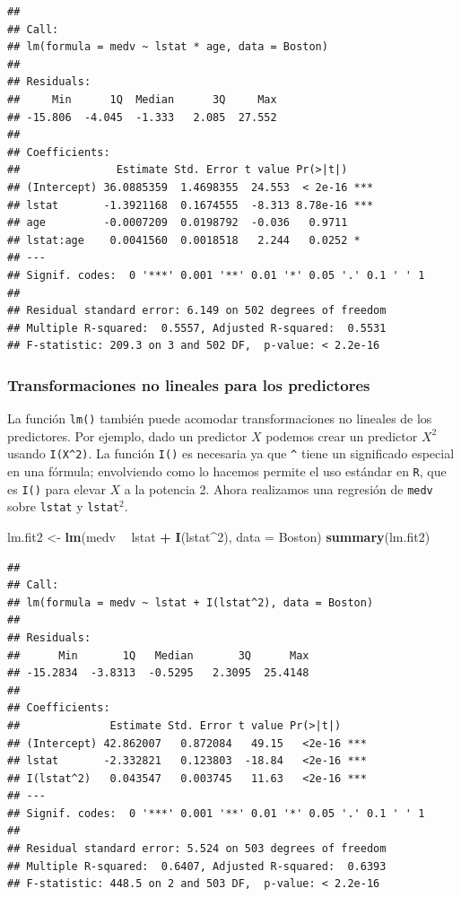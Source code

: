 \documentclass[]{book}
\newenvironment{Shaded}{\begin{snugshade}}{\end{snugshade}}
\newcommand{\KeywordTok}[1]{\textcolor[rgb]{0.13,0.29,0.53}{\textbf{#1}}}
\newcommand{\DataTypeTok}[1]{\textcolor[rgb]{0.13,0.29,0.53}{#1}}
\newcommand{\DecValTok}[1]{\textcolor[rgb]{0.00,0.00,0.81}{#1}}
\newcommand{\StringTok}[1]{\textcolor[rgb]{0.31,0.60,0.02}{#1}}
\newcommand{\OperatorTok}[1]{\textcolor[rgb]{0.81,0.36,0.00}{\textbf{#1}}}
\newcommand{\NormalTok}[1]{#1}
\begin{document}
\begin{verbatim}
## 
## Call:
## lm(formula = medv ~ lstat * age, data = Boston)
## 
## Residuals:
##     Min      1Q  Median      3Q     Max 
## -15.806  -4.045  -1.333   2.085  27.552 
## 
## Coefficients:
##               Estimate Std. Error t value Pr(>|t|)    
## (Intercept) 36.0885359  1.4698355  24.553  < 2e-16 ***
## lstat       -1.3921168  0.1674555  -8.313 8.78e-16 ***
## age         -0.0007209  0.0198792  -0.036   0.9711    
## lstat:age    0.0041560  0.0018518   2.244   0.0252 *  
## ---
## Signif. codes:  0 '***' 0.001 '**' 0.01 '*' 0.05 '.' 0.1 ' ' 1
## 
## Residual standard error: 6.149 on 502 degrees of freedom
## Multiple R-squared:  0.5557, Adjusted R-squared:  0.5531 
## F-statistic: 209.3 on 3 and 502 DF,  p-value: < 2.2e-16
\end{verbatim}

\subsubsection{Transformaciones no lineales para los
predictores}\label{transformaciones-no-lineales-para-los-predictores}

La función \texttt{lm()} también puede acomodar transformaciones no
lineales de los predictores. Por ejemplo, dado un predictor \(X\)
podemos crear un predictor \(X^2\) usando \texttt{I(X\^{}2)}. La función
\texttt{I()} es necesaria ya que \texttt{\^{}} tiene un significado
especial en una fórmula; envolviendo como lo hacemos permite el uso
estándar en \texttt{R}, que es \texttt{I()} para elevar \(X\) a la
potencia 2. Ahora realizamos una regresión de \texttt{medv} sobre
\texttt{lstat} y \texttt{lstat}\(^2\).

\begin{Shaded}
\begin{Highlighting}[]
\NormalTok{lm.fit2 <-}\StringTok{ }\KeywordTok{lm}\NormalTok{(medv }\OperatorTok{~}\StringTok{ }\NormalTok{lstat }\OperatorTok{+}\StringTok{ }\KeywordTok{I}\NormalTok{(lstat}\OperatorTok{^}\DecValTok{2}\NormalTok{), }\DataTypeTok{data =}\NormalTok{ Boston)}
\KeywordTok{summary}\NormalTok{(lm.fit2)}
\end{Highlighting}
\end{Shaded}

\begin{verbatim}
## 
## Call:
## lm(formula = medv ~ lstat + I(lstat^2), data = Boston)
## 
## Residuals:
##      Min       1Q   Median       3Q      Max 
## -15.2834  -3.8313  -0.5295   2.3095  25.4148 
## 
## Coefficients:
##              Estimate Std. Error t value Pr(>|t|)    
## (Intercept) 42.862007   0.872084   49.15   <2e-16 ***
## lstat       -2.332821   0.123803  -18.84   <2e-16 ***
## I(lstat^2)   0.043547   0.003745   11.63   <2e-16 ***
## ---
## Signif. codes:  0 '***' 0.001 '**' 0.01 '*' 0.05 '.' 0.1 ' ' 1
## 
## Residual standard error: 5.524 on 503 degrees of freedom
## Multiple R-squared:  0.6407, Adjusted R-squared:  0.6393 
## F-statistic: 448.5 on 2 and 503 DF,  p-value: < 2.2e-16
\end{verbatim}
\end{document}

